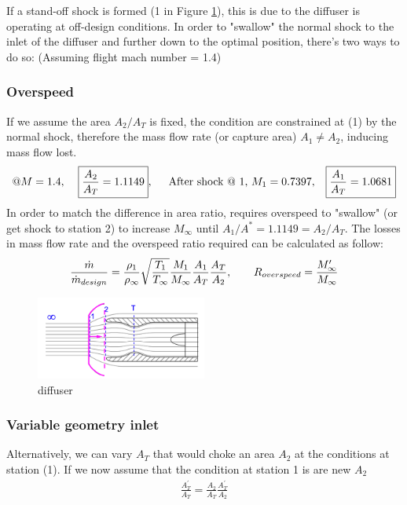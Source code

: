 \documentclass[a4paper,10pt]{article}
\begin{document}
If a stand-off shock is formed (1 in Figure \ref{fig:diffuser}), this is due to the diffuser is operating at off-design conditions. In order to "swallow" the normal shock to the inlet of the diffuser and further down to the optimal position, there's two ways to do so: (Assuming flight mach number = 1.4)

\subsubsection{Overspeed}
If we assume the area $A_2/A_T$ is fixed, the condition are constrained at (1) by the normal shock, therefore the mass flow rate (or capture area) $A_1\neq A_2$, inducing mass flow lost. 
\begin{gather*}
    @M=1.4,\hspace*{0.4cm}\boxed{\frac{A_2}{A_T} = 1.1149},\hspace*{0.5cm}\text{After shock @ 1, }M_1=0.7397,\hspace*{0.3cm}\boxed{\frac{A_1}{A_T} = 1.0681}
\end{gather*}
In order to match the difference in area ratio, requires overspeed to "swallow" (or get shock to station 2) to increase $M_\infty$ until $A_1/A^* = 1.1149=A_2/A_T$. The losses in mass flow rate and the overspeed ratio required can be calculated as follow:
\begin{gather*}
    \frac{\dot{m}}{\dot{m}_{design}} = \frac{\rho_1}{\rho_\infty}\sqrt{\frac{T_1}{T_\infty}}\frac{M_1}{M_\infty}\frac{A_1}{A_T}\frac{A_T}{A_2},\hspace*{0.7cm}R_{overspeed} = \frac{M_\infty^{\prime}}{M_\infty}
\end{gather*}

\begin{figure}[H]
    \centering
    \includegraphics[width=0.5\textwidth]{Figure/diffuser.png}
    \caption{diffuser}
    \label{fig:diffuser}
\end{figure}

\subsubsection{Variable geometry inlet}
Alternatively, we can vary $A_T$ that would choke an area $A_2$ at the conditions at station (1). If we now assume that the condition at station 1 is are new $A_2$
\begin{gather*}
    \frac{A_T^{\prime}}{A_T} = \frac{A_2}{A_T}\frac{A_T^{\prime}}{A_2}
\end{gather*}
\end{document}
